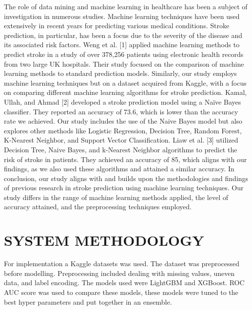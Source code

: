 \documentclass{article}
\begin{document}
The role of data mining and machine learning in healthcare has been a subject of investigation in numerous studies. Machine learning techniques have been used extensively in recent years for predicting various medical conditions. Stroke prediction, in particular, has been a focus due to the severity of the disease and its associated risk factors.
Weng et al. [1] applied machine learning methods to predict stroke in a study of over 378,256 patients using electronic health records from two large UK hospitals. Their study focused on the comparison of machine learning methods to standard prediction models. Similarly, our study employs machine learning techniques but on a dataset acquired from Kaggle, with a focus on comparing different machine learning algorithms for stroke prediction.
Kamal, Ullah, and Ahmad [2] developed a stroke prediction model using a Naïve Bayes classifier. They reported an accuracy of 73.6, which is lower than the accuracy rate we achieved. Our study includes the use of the Naive Bayes model but also explores other methods like Logistic Regression, Decision Tree, Random Forest, K-Nearest Neighbor, and Support Vector Classification. Liaw et al. [3] utilized Decision Tree, Naive Bayes, and k-Nearest Neighbor algorithms to predict the risk of stroke in patients. They achieved an accuracy of 85, which aligns with our findings, as we also used these algorithms and attained a similar accuracy.
In conclusion, our study aligns with and builds upon the methodologies and findings of previous research in stroke prediction using machine learning techniques. Our study differs in the range of machine learning methods applied, the level of accuracy attained, and the preprocessing techniques employed.


\section{SYSTEM METHODOLOGY}
\label{gen_inst}
For implementation a Kaggle datasets was used. The dataset was preprocessed before modelling. Preprocessing included dealing with missing values, uneven data, and label encoding. The models used were LightGBM and XGBoost. ROC AUC score was used to compare these models, these models were tuned to the best hyper parameters and put together in an ensemble.
\end{document}
